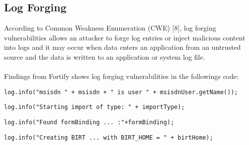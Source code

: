 \documentclass[11pt,a4paper]{article}
\theoremstyle{definition}
\begin{document}
\subsection{Log Forging}
According to Common Weakness Enumeration (CWE) [8], log forging vulnerabilities allows an attacker to forge log entries or inject malicious content into logs and it may occur when data enters an application from an untrusted source and the data is written to an application or system log file.\\\\
Findings from Fortify shows log forging vulnerabilities in the followings code: 


\begin{lstlisting}[caption=DataImportServlet.java:124]
log.info("msisdn " + msisdn + " is user " + msisdnUser.getName());
\end{lstlisting}

\begin{lstlisting}[caption=ImportServlet.java:77]
log.info("Starting import of type: " + importType);
\end{lstlisting}

\begin{lstlisting}[caption=ReExportAllFormData.java:88]
log.info("Found formBinding ... :"+formBinding);
\end{lstlisting}

\begin{lstlisting}[caption=ReportManager.java:125]
log.info("Creating BIRT ... with BIRT_HOME = " + birtHome);
\end{lstlisting} 
\end{document}

